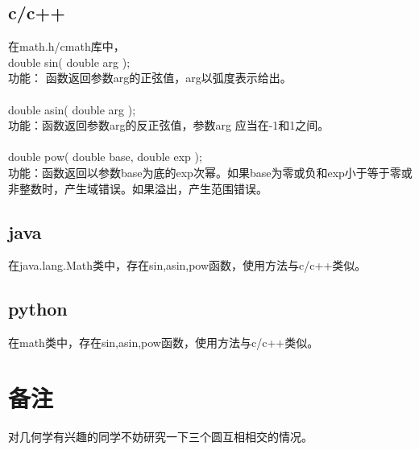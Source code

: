 \documentclass{article}
\begin{document}
		\subsection*{c/c++}
			在math.h/cmath库中，\\
			\indent double sin( double arg );\\
			\indent 功能： 函数返回参数arg的正弦值，arg以弧度表示给出。\\\\
			\indent double asin( double arg );\\
			\indent 功能：函数返回参数arg的反正弦值，参数arg 应当在-1和1之间。\\\\
			\indent double pow( double base, double exp );\\
			\indent 功能：函数返回以参数base为底的exp次幂。如果base为零或负和exp小于等于零或非整数时，产生域错误。如果溢出，产生范围错误。 

		\subsection*{java}
			在java.lang.Math类中，存在sin,asin,pow函数，使用方法与c/c++类似。

		\subsection*{python}
			在math类中，存在sin,asin,pow函数，使用方法与c/c++类似。
			
	\section*{备注}
		\indent 对几何学有兴趣的同学不妨研究一下三个圆互相相交的情况。\\

	
\end{document}
